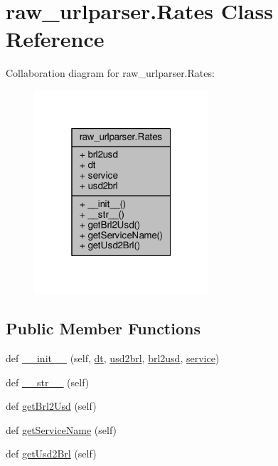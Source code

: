 \hypertarget{classraw__urlparser_1_1_rates}{}\section{raw\+\_\+urlparser.\+Rates Class Reference}
\label{classraw__urlparser_1_1_rates}


Collaboration diagram for raw\+\_\+urlparser.\+Rates\+:\nopagebreak
\begin{figure}[H]
\begin{center}
\leavevmode
\includegraphics[width=184pt]{classraw__urlparser_1_1_rates__coll__graph}
\end{center}
\end{figure}
\subsection*{Public Member Functions}
\begin{DoxyCompactItemize}
\item 
def \hyperlink{classraw__urlparser_1_1_rates_a7d9b61bce159f7e52bdf8a1ebfada45d}{\+\_\+\+\_\+init\+\_\+\+\_\+} (self, \hyperlink{classraw__urlparser_1_1_rates_a09b3c7cb595f3135c3eda648b1bb4c3f}{dt}, \hyperlink{classraw__urlparser_1_1_rates_a52d9b688be8385a87783b27839749b4a}{usd2brl}, \hyperlink{classraw__urlparser_1_1_rates_adc9df007bec75344f9f89cb631d1aeb3}{brl2usd}, \hyperlink{classraw__urlparser_1_1_rates_acb05316e95a39bc42590a882712f854b}{service})
\item 
def \hyperlink{classraw__urlparser_1_1_rates_a3e8a9922ba7e95bd54945c87d07e5f0e}{\+\_\+\+\_\+str\+\_\+\+\_\+} (self)
\item 
def \hyperlink{classraw__urlparser_1_1_rates_a28e3ff2d763165bfa725b8c4954722f7}{get\+Brl2\+Usd} (self)
\item 
def \hyperlink{classraw__urlparser_1_1_rates_ab4bd310d43849fed2df00b15b387254e}{get\+Service\+Name} (self)
\item 
def \hyperlink{classraw__urlparser_1_1_rates_ab21c629a2310a331a7b66e991868b6d3}{get\+Usd2\+Brl} (self)
\end{DoxyCompactItemize}
